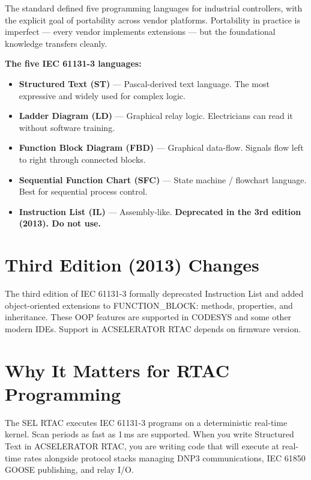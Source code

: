 \documentclass[12pt,twoside,openright]{memoir}
\begin{document}
The standard defined five programming languages for industrial controllers, with the explicit goal of portability across vendor platforms. Portability in practice is imperfect --- every vendor implements extensions --- but the foundational knowledge transfers cleanly.

\begin{keyconcept}
\textbf{The five IEC 61131-3 languages:}
\begin{itemize}
  \item \textbf{Structured Text (ST)} --- Pascal-derived text language. The most expressive and widely used for complex logic.
  \item \textbf{Ladder Diagram (LD)} --- Graphical relay logic. Electricians can read it without software training.
  \item \textbf{Function Block Diagram (FBD)} --- Graphical data-flow. Signals flow left to right through connected blocks.
  \item \textbf{Sequential Function Chart (SFC)} --- State machine / flowchart language. Best for sequential process control.
  \item \textbf{Instruction List (IL)} --- Assembly-like. \textbf{Deprecated in the 3rd edition (2013). Do not use.}
\end{itemize}
\end{keyconcept}

\section{Third Edition (2013) Changes}

The third edition of IEC 61131-3 formally deprecated Instruction List and added object-oriented extensions to FUNCTION\_BLOCK: methods, properties, and inheritance. These OOP features are supported in CODESYS and some other modern IDEs. Support in ACSELERATOR RTAC depends on firmware version.

\section{Why It Matters for RTAC Programming}

The SEL RTAC executes IEC 61131-3 programs on a deterministic real-time kernel. Scan periods as fast as 1\,ms are supported. When you write Structured Text in ACSELERATOR RTAC, you are writing code that will execute at real-time rates alongside protocol stacks managing DNP3 communications, IEC 61850 GOOSE publishing, and relay I/O.
\end{document}
